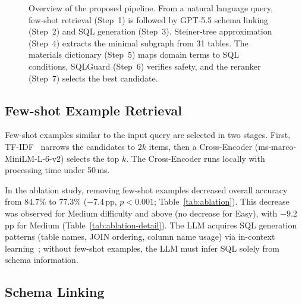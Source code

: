 \documentclass{npj-compt.mater}
\begin{document}
\begin{figure}[htbp]
{%
}%
\caption{Overview of the proposed pipeline.
  From a natural language query, few-shot retrieval (Step~1) is followed by
  GPT-5.5 schema linking (Step~2) and SQL generation (Step~3).
  Steiner-tree approximation (Step~4) extracts the minimal subgraph from 31 tables.
  The materials dictionary (Step~5) maps domain terms to SQL conditions,
  SQLGuard (Step~6) verifies safety, and
  the reranker (Step~7) selects the best candidate.}
\label{fig:pipeline}
\end{figure}

\subsection{Few-shot Example Retrieval}
\label{sec:fewshot}

Few-shot examples similar to the input query are selected in two stages.
First, TF-IDF~\cite{salton1988tfidf} narrows the candidates to $2k$ items,
then a Cross-Encoder (ms-marco-MiniLM-L-6-v2) selects the top $k$.
The Cross-Encoder runs locally with processing time under 50\,ms.

In the ablation study, removing few-shot examples decreased
overall accuracy from 84.7\% to 77.3\% ($-$7.4\,pp,
$p<0.001$; Table~\ref{tab:ablation}).
This decrease was observed for Medium difficulty and above (no decrease for Easy),
with $-$9.2\,pp for Medium (Table~\ref{tab:ablation-detail}).
The LLM acquires SQL generation patterns
(table names, JOIN ordering, column name usage)
via in-context learning~\cite{brown2020fewshot};
without few-shot examples, the LLM must infer SQL solely from schema information.

\subsection{Schema Linking}
\end{document}
